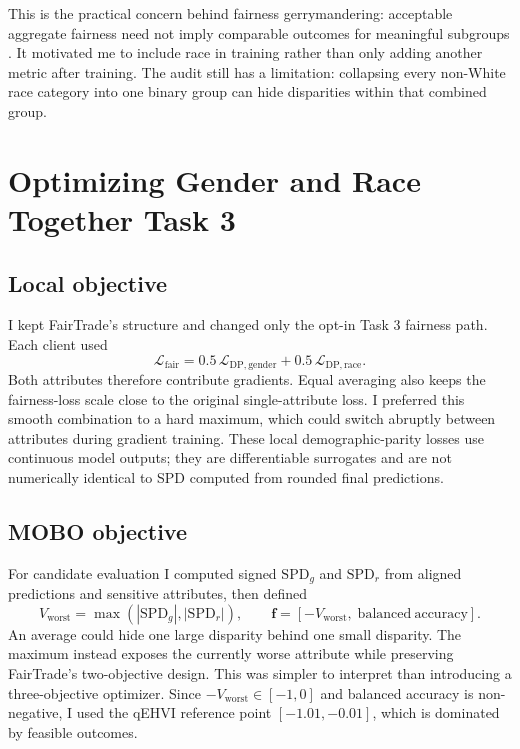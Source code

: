 \documentclass[10pt,a4paper]{article}
\newcommand{\tasktag}[1]{\textcolor{accent}{\textbf{Task #1}}}
\begin{document}
This is the practical concern behind fairness gerrymandering: acceptable aggregate fairness need not imply comparable outcomes for meaningful subgroups \citep{kearns2018gerrymandering}. It motivated me to include race in training rather than only adding another metric after training. The audit still has a limitation: collapsing every non-White race category into one binary group can hide disparities within that combined group.

\vfill
\newpage

\section*{Optimizing Gender and Race Together \hfill \tasktag{3}}

\subsection*{Local objective}
I kept FairTrade's structure and changed only the opt-in Task 3 fairness path. Each client used
\[
 \mathcal{L}_{\mathrm{fair}}=0.5\,\mathcal{L}_{\mathrm{DP,gender}}
                              +0.5\,\mathcal{L}_{\mathrm{DP,race}}.
\]
Both attributes therefore contribute gradients. Equal averaging also keeps the fairness-loss scale close to the original single-attribute loss. I preferred this smooth combination to a hard maximum, which could switch abruptly between attributes during gradient training. These local demographic-parity losses use continuous model outputs; they are differentiable surrogates and are not numerically identical to SPD computed from rounded final predictions.

\subsection*{MOBO objective}
For candidate evaluation I computed signed $\mathrm{SPD}_{g}$ and $\mathrm{SPD}_{r}$ from aligned predictions and sensitive attributes, then defined
\[
 V_{\mathrm{worst}}=\max\!\left(|\mathrm{SPD}_{g}|,|\mathrm{SPD}_{r}|\right),
 \qquad \mathbf{f}=\left[-V_{\mathrm{worst}},\;\mathrm{balanced\ accuracy}\right].
\]
An average could hide one large disparity behind one small disparity. The maximum instead exposes the currently worse attribute while preserving FairTrade's two-objective design. This was simpler to interpret than introducing a three-objective optimizer. Since $-V_{\mathrm{worst}}\in[-1,0]$ and balanced accuracy is non-negative, I used the qEHVI reference point $[-1.01,-0.01]$, which is dominated by feasible outcomes.
\end{document}
